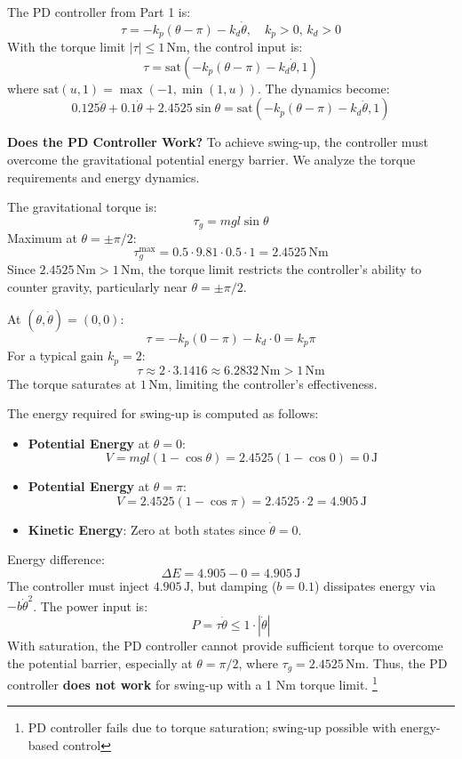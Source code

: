 \documentclass[12pt,a4paper]{article}
\begin{document}
The PD controller from Part 1 is:
\[
\tau = -k_p (\theta - \pi) - k_d \dot{\theta}, \quad k_p > 0, \, k_d > 0
\]
With the torque limit \(|\tau| \leq 1 \, \text{Nm}\), the control input is:
\[
\tau = \text{sat} \left( -k_p (\theta - \pi) - k_d \dot{\theta}, 1 \right)
\]
where \(\text{sat}(u, 1) = \max(-1, \min(1, u))\). The dynamics become:
\[
0.125 \ddot{\theta} + 0.1 \dot{\theta} + 2.4525 \sin \theta = \text{sat} \left( -k_p (\theta - \pi) - k_d \dot{\theta}, 1 \right)
\]

\textbf{Does the PD Controller Work?}
To achieve swing-up, the controller must overcome the gravitational potential energy barrier. We analyze the torque requirements and energy dynamics.


The gravitational torque is:
\[
\tau_g = m g l \sin \theta
\]
Maximum at \(\theta = \pm \pi/2\):
\[
\tau_g^{\text{max}} = 0.5 \cdot 9.81 \cdot 0.5 \cdot 1 = 2.4525 \, \text{Nm}
\]
Since \(2.4525 \, \text{Nm} > 1 \, \text{Nm}\), the torque limit restricts the controller’s ability to counter gravity, particularly near \(\theta = \pm \pi/2\).


At \((\theta, \dot{\theta}) = (0, 0)\):
\[
\tau = -k_p (0 - \pi) - k_d \cdot 0 = k_p \pi
\]
For a typical gain \(k_p = 2\):
\[
\tau \approx 2 \cdot 3.1416 \approx 6.2832 \, \text{Nm} > 1 \, \text{Nm}
\]
The torque saturates at \(1 \, \text{Nm}\), limiting the controller’s effectiveness.


The energy required for swing-up is computed as follows:
\begin{itemize}
    \item \textbf{Potential Energy} at \(\theta = 0\):
    \[
    V = m g l (1 - \cos \theta) = 2.4525 (1 - \cos 0) = 0 \, \text{J}
    \]
    \item \textbf{Potential Energy} at \(\theta = \pi\):
    \[
    V = 2.4525 (1 - \cos \pi) = 2.4525 \cdot 2 = 4.905 \, \text{J}
    \]
    \item \textbf{Kinetic Energy}: Zero at both states since \(\dot{\theta} = 0\).
\end{itemize}
Energy difference:
\[
\Delta E = 4.905 - 0 = 4.905 \, \text{J}
\]
The controller must inject \(4.905 \, \text{J}\), but damping (\(b = 0.1\)) dissipates energy via \(-b \dot{\theta}^2\). The power input is:
\[
P = \tau \dot{\theta} \leq 1 \cdot |\dot{\theta}|
\]
With saturation, the PD controller cannot provide sufficient torque to overcome the potential barrier, especially at \(\theta = \pi/2\), where \(\tau_g = 2.4525 \, \text{Nm}\). Thus, the PD controller \textbf{does not work} for swing-up with a 1 Nm torque limit. \footnote{PD controller fails due to torque saturation; swing-up possible with energy-based control}
\end{document}
